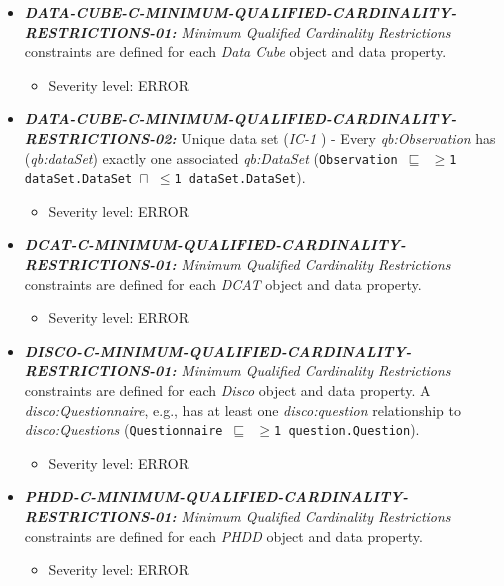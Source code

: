 \documentclass{llncs}
\newcommand{\ms}[1]{\texttt{#1}}
\begin{document}
\begin{itemize}
	\item \textbf{{\em DATA-CUBE-C-MINIMUM-QUALIFIED-CARDINALITY-RESTRICTIONS-01:}}
	{\em Minimum Qualified Cardinality Restrictions} constraints are defined for each \emph{Data Cube} object and data property.
	\begin{itemize}
		\item Severity level: ERROR
	\end{itemize}
		\item \textbf{{\em DATA-CUBE-C-MINIMUM-QUALIFIED-CARDINALITY-RESTRICTIONS-02:}}
	Unique data set (\emph{IC-1} \cite{CyganiakReynolds2014}) -  
	Every \emph{qb:Observation} has (\emph{qb:dataSet}) exactly one associated \emph{qb:DataSet} (\ms{Observation $\sqsubseteq$ $\geq$1 dataSet.DataSet $\sqcap$ $\leq$1 dataSet.DataSet}). 
	\begin{itemize}
		\item Severity level: ERROR
	\end{itemize}
\end{itemize}

\begin{itemize}
	\item \textbf{{\em DCAT-C-MINIMUM-QUALIFIED-CARDINALITY-RESTRICTIONS-01:}}
	{\em Minimum Qualified Cardinality Restrictions} constraints are defined for each \emph{DCAT} object and data property.
	\begin{itemize}
		\item Severity level: ERROR
	\end{itemize}
\end{itemize}

\begin{itemize}
	\item \textbf{{\em DISCO-C-MINIMUM-QUALIFIED-CARDINALITY-RESTRICTIONS-01:}}
	{\em Minimum Qualified Cardinality Restrictions} constraints are defined for each \emph{Disco} object and data property.
  A {\em disco:Questionnaire}, e.g., has at least one {\em disco:question} relationship to {\em disco:Questions} (\ms{Questionnaire $\sqsubseteq$ $\geq$1 question.Question}).
	\begin{itemize}
		\item Severity level: ERROR
	\end{itemize}
\end{itemize}

\begin{itemize}
	\item \textbf{{\em PHDD-C-MINIMUM-QUALIFIED-CARDINALITY-RESTRICTIONS-01:}}
	{\em Minimum Qualified Cardinality Restrictions} constraints are defined for each \emph{PHDD} object and data property.
	\begin{itemize}
		\item Severity level: ERROR
	\end{itemize}
\end{itemize}
\end{document}
